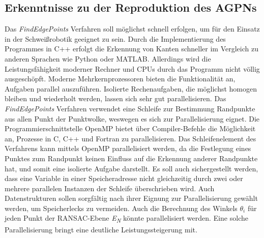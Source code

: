 \subsection{Erkenntnisse zu der Reproduktion des AGPNs}
Das \textit{FindEdgePoints} Verfahren soll möglichst schnell erfolgen, um für den Einsatz in der Schweißrobotik geeignet zu sein. Durch die Implementierung des Programmes in C++ erfolgt die Erkennung von Kanten schneller im Vergleich zu anderen Sprachen wie Python oder MATLAB. Allerdings wird die Leistungsfähigkeit moderner Rechner und CPUs durch das Programm nicht völlig ausgeschöpft. Moderne Mehrkernprozessoren bieten die Funktionalität an, Aufgaben parallel auszuführen. Isolierte Rechenaufgaben, die möglichst homogen bleiben und wiederholt werden, lassen sich sehr gut parallelisieren. Das \textit{FindEdgePoints} Verfahren verwendet eine Schleife zur Bestimmung Randpunkte aus allen Punkt der Punktwolke, weswegen es sich zur Parallelisierung eignet. Die Programmierschnittstelle OpenMP bietet über Compiler-Befehle die Möglichkeit an, Prozesse in C, C++ und Fortran zu parallelisieren. Das Schleifenelement des Verfahrens kann mittels OpenMP parallelisiert werden, da die Festlegung eines Punktes zum Randpunkt keinen Einfluss auf die Erkennung anderer Randpunkte hat, und somit eine isolierte Aufgabe darstellt. Es soll auch sichergestellt werden, dass eine Variable in einer Speicheradresse nicht gleichzeitig durch zwei oder mehrere parallelen Instanzen der Schleife überschrieben wird. Auch Datenstrukturen sollen sorgfältig nach ihrer Eignung zur Parallelisierung gewählt werden, um Speicherlecks zu vermeiden. Auch die Berechnung des Winkels $\theta_i$ für jeden Punkt der RANSAC-Ebene \textit{E\textsubscript{N}} könnte parallelisiert werden. Eine solche Parallelisierung bringt eine deutliche Leistungssteigerung mit. 


